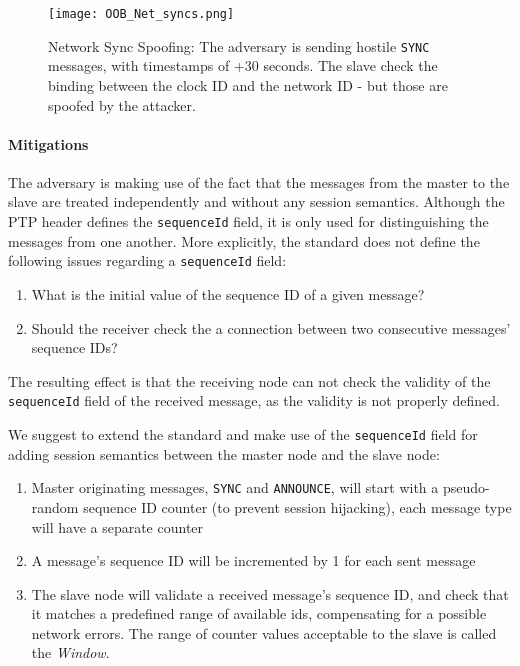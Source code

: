 \documentclass[11pt]{article}
\begin{document}
\begin{figure}[t]

\centerline{\texttt{[image: OOB\_Net\_syncs.png]}}

\caption{Network Sync Spoofing: The adversary is sending hostile \texttt{SYNC} messages, with timestamps of +30 seconds. The slave check the binding between the clock ID and the network ID - but those are spoofed by the attacker.}

\label{Net Sync Spoof}

\end{figure}



\paragraph{Mitigations}\label{time:scenrio3mit}

The adversary is making use of the fact that the messages from the master to the slave are treated independently and without any session semantics. Although the PTP header defines the \texttt{sequenceId} field, it is only used for distinguishing the messages from one another. More explicitly, the standard does not define the following issues regarding a \texttt{sequenceId} field:

\begin{enumerate}

  \item What is the initial value of the sequence ID of a given message?

  \item Should the receiver check the a connection between two consecutive messages' sequence IDs?

\end{enumerate}

The resulting effect is that the receiving node can not check the validity of the \texttt{sequenceId} field of the received message, as the validity is not properly defined.



We suggest to extend the standard and make use of the \texttt{sequenceId} field for adding session semantics between the master node and the slave node:

\begin{enumerate}

  \item Master originating messages, \texttt{SYNC} and \texttt{ANNOUNCE}, will start with a pseudo-random sequence ID counter (to prevent session hijacking), each message type will have a separate counter

  \item A message's sequence ID will be incremented by 1 for each sent message

  \item The slave node will validate a received message's sequence ID, and check that it matches a predefined range of available ids, compensating for a possible network errors. The range of counter values acceptable to the slave is called the \emph{Window}.

\end{enumerate}
\end{document}

